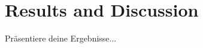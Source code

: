 \tikzset{external/prefix=tikz/Results/}
\chapter{Results and Discussion}
Präsentiere deine Ergebnisse...